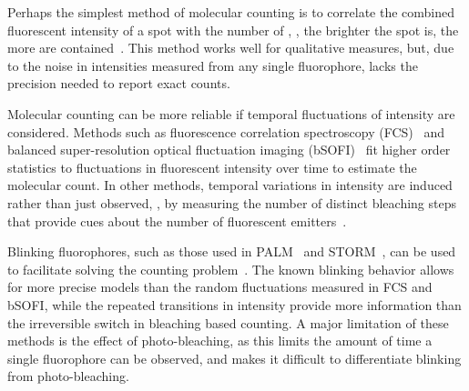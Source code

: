 %
%


%
Perhaps the simplest method of molecular counting is to correlate the combined
fluorescent intensity of a spot with the number of \smallobjects, \ie, the
brighter the spot is, the more \smallobjects are contained~\citep{schmied_2012,
tolar_2005}.
  This method works well for qualitative measures, but, due to the noise in
  intensities measured from any single fluorophore, lacks the precision needed
  to report exact counts.

%
Molecular counting can be more reliable if temporal fluctuations of intensity
are considered.
  Methods such as fluorescence correlation spectroscopy
  (FCS)~\citep{otsuka_2023,wachsmuth_2015,politi_2018} and balanced
  super-resolution optical fluctuation imaging
  (bSOFI)~\citep{geissbuehler_2012} fit higher order statistics to fluctuations
  in fluorescent intensity over time to estimate the molecular count.
  In other methods, temporal variations in intensity are induced rather than
  just observed, \eg, by measuring the number of distinct bleaching
  steps that provide cues about the number of fluorescent
  emitters~\citep{ulbrich_2007,jain_2011,hummert_2021}.

%
Blinking fluorophores, such as those used in
PALM~\citep{sengupta_pcPALM_2011,lee_counting_2012} and
STORM~\citep{patel_blinking_2021}, can be used to facilitate solving the counting
problem~\citep{rollins_stochastic_2015,nino_2017}.
  The known blinking behavior allows for more precise models than the random
  fluctuations measured in FCS and bSOFI, while the repeated transitions in
  intensity provide more information than the irreversible switch in bleaching
  based counting.
  A major limitation of these methods is the effect of photo-bleaching, as this
  limits the amount of time a single fluorophore can be observed, and makes it
  difficult to differentiate blinking from photo-bleaching.

